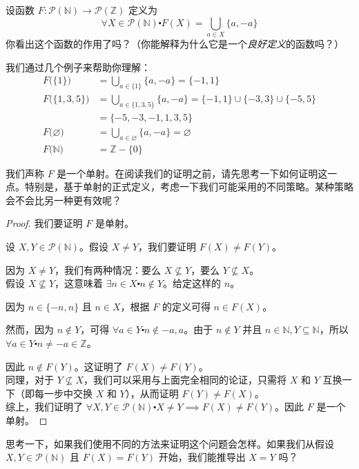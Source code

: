 \begin{example}
    设函数 $F : \mathcal{P}(\mathbb{N}) \to \mathcal{P}(\mathbb{Z})$ 定义为
    \[\forall X \in \mathcal{P}(\mathbb{N}) \centerdot F(X) = \bigcup_{a \in X} \{a, -a\}\]
    你看出这个函数的作用了吗？（你能解释为什么它是一个\emph{良好定义}的函数吗？）

    我们通过几个例子来帮助你理解：
    \begin{align*}
        F\big(\{1\}\big) &= \bigcup_{a \in \{1\}} \{a, -a\} = \{-1,1\} \\
        F\big(\{1,3,5\}\big) &= \bigcup_{a \in \{1,3,5\}} \{a, -a\} = \{-1,1\} \cup \{-3,3\} \cup \{-5,5\} \\
        &= \{-5,-3,-1,1,3,5\}\\
        F\big(\varnothing\big) &= \bigcup_{a \in \varnothing} \{a, -a\} = \varnothing \\
        F\big(\mathbb{N}\big) &= \mathbb{Z} - \{0\}
    \end{align*}

    我们声称 $F$ 是一个单射。在阅读我们的证明之前，请先思考一下如何证明这一点。特别是，基于单射的正式定义，考虑一下我们可能采用的不同策略。某种策略会不会比另一种更有效呢？

    \begin{proof}
        我们要证明 $F$ 是单射。
        
        设 $X,Y \in \mathcal{P}(\mathbb{N})$。假设 $X \ne Y$，我们要证明 $F(X) \ne F(Y)$。

        因为 $X \ne Y$，我们有两种情况：要么 $X \nsubseteq Y$，要么 $Y \nsubseteq X$。\\

        假设 $X \nsubseteq Y$，这意味着 $\exists n \in X \centerdot n \notin Y$。给定这样的 $n$。

        因为 $n \in \{-n, n\}$ 且 $n \in X$，根据 $F$ 的定义可得 $n \in F(X)$。

        然而，因为 $n \notin Y$，可得 $\forall a \in Y \centerdot n \notin {-a, a}$。由于 $n \notin Y$ 并且 $n \in \mathbb{N}, Y \subseteq \mathbb{N}$，所以 $\forall a \in Y \centerdot n \ne -a \in \mathbb{Z}$。

        因此 $n \notin F(Y)$。这证明了 $F(X) \ne F(Y)$。\\

        同理，对于 $Y \nsubseteq X$，我们可以采用与上面完全相同的论证，只需将 $X$ 和 $Y$ 互换一下（即每一步中交换 $X$ 和 $Y$），从而证明 $F(Y) \ne F(X)$。\\

        综上，我们证明了 $\forall X, Y \in \mathcal{P}(\mathbb{N}) \centerdot X \ne Y \implies F(X) \ne F(Y)$。因此 $F$ 是一个单射。
    \end{proof}

    思考一下，如果我们使用不同的方法来证明这个问题会怎样。如果我们从假设 $X, Y \in \mathcal{P}(\mathbb{N})$ 且 $F(X) = F(Y)$ 开始，我们能推导出 $X = Y$ 吗？
\end{example}